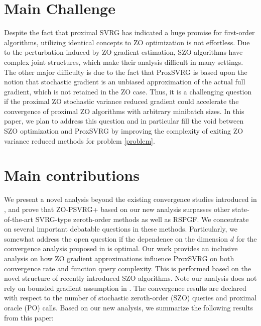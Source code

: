 \section{Main Challenge}
Despite the fact that proximal SVRG has indicated a huge promise for first-order algorithms, utilizing identical concepts to ZO optimization is not effortless. 
Due to the perturbation induced by ZO gradient estimation, SZO algorithms have complex joint structures, which make their analysis difficult in many settings. The other major difficulty is due to the fact that ProxSVRG is based upon the notion that stochastic gradient is an unbiased approximation of the actual full gradient, which is not retained in the ZO case. Thus, it is a challenging question if the proximal ZO stochastic variance reduced gradient could accelerate the convergence of proximal ZO algorithms with arbitrary minibatch sizes. In this paper, we plan to address this question and in particular fill the void between
SZO optimization and ProxSVRG by improving the complexity of exiting ZO variance reduced methods for problem \eqref{problem}.
\fi


\section{Main contributions}
We present a novel analysis beyond the existing convergence studies introduced in \cite{liu2018zeroth,ji2019improved}, and
prove that ZO-PSVRG+ based on  our new analysis surpasses other state-of-the-art SVRG-type zeroth-order methods as well as RSPGF.
We concentrate on several important debatable questions in these methods. Particularly, we somewhat address the open question if the dependence on the dimension $d$ for the convergence analysis proposed in \cite{liu2018zeroth} is optimal. Our work provides an inclusive analysis on how ZO gradient approximations influence ProxSVRG on both  convergence rate and function query complexity. This
is performed based on the novel structure of recently introduced SZO algorithms.
Note our analysis does not rely on bounded gradient assumption in \cite{ghadimi2016accelerated,huang2019faster}.
The convergence results are declared with respect to the number of stochastic zeroth-order (SZO) queries and proximal oracle (PO) calls. 
Based on our new analysis, we summarize the following results from this paper:

